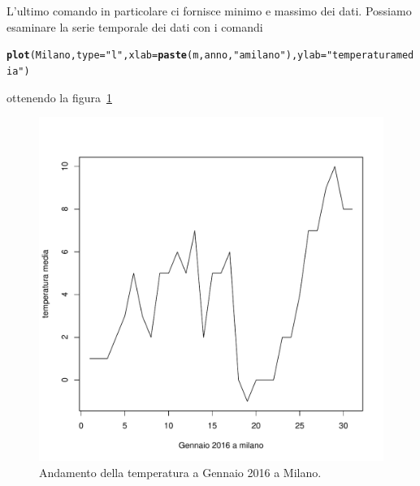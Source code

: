 \documentclass[onecolumn,12pt]{book}\usepackage[]{graphicx}\usepackage[]{color}
\makeatletter
\def\maxwidth{ %
  \ifdim\Gin@nat@width>\linewidth
    \linewidth
  \else
    \Gin@nat@width
  \fi
}
\newcommand{\hlstr}[1]{\textcolor[rgb]{0.192,0.494,0.8}{#1}}%
\newcommand{\hlstd}[1]{\textcolor[rgb]{0.345,0.345,0.345}{#1}}%
\newcommand{\hlkwc}[1]{\textcolor[rgb]{0.333,0.667,0.333}{#1}}%
\newcommand{\hlkwd}[1]{\textcolor[rgb]{0.737,0.353,0.396}{\textbf{#1}}}%
\newenvironment{kframe}{%
 \def\at@end@of@kframe{}%
 \ifinner\ifhmode%
  \def\at@end@of@kframe{\end{minipage}}%
  \begin{minipage}{\columnwidth}%
 \fi\fi%
 \def\FrameCommand##1{\hskip\@totalleftmargin \hskip-\fboxsep
 \colorbox{shadecolor}{##1}\hskip-\fboxsep
     \hskip-\linewidth \hskip-\@totalleftmargin \hskip\columnwidth}%
 \MakeFramed {\advance\hsize-\width
   \@totalleftmargin\z@ \linewidth\hsize
   \@setminipage}}%
 {\par\unskip\endMakeFramed%
 \at@end@of@kframe}
\newenvironment{knitrout}{}{} %
\makeatother
\begin{document}
L'ultimo comando in particolare ci fornisce minimo e massimo dei dati.
Possiamo esaminare la serie temporale dei dati con i comandi
\begin{knitrout}
\color{fgcolor}\begin{kframe}
\begin{alltt}
\hlkwd{plot}\hlstd{(Milano,}\hlkwc{type}\hlstd{=}\hlstr{"l"}\hlstd{,}\hlkwc{xlab}\hlstd{=}\hlkwd{paste}\hlstd{(m,anno,} \hlstr{"a milano"}\hlstd{),}\hlkwc{ylab}\hlstd{=}\hlstr{"temperatura media"}\hlstd{)}
\end{alltt}
\end{kframe}
\end{knitrout}
ottenendo la figura~\ref{fig:datiist}
\begin{figure}[htbp]
\begin{center}
\begin{knitrout}
\color{fgcolor}
\includegraphics[width=\maxwidth]{figure/unnamed-chunk-98-1} 

\end{knitrout}
\caption{ Andamento della temperatura a Gennaio 2016  a Milano. }
\label{fig:datiist}
\end{center}
\end{figure}
\end{document}
